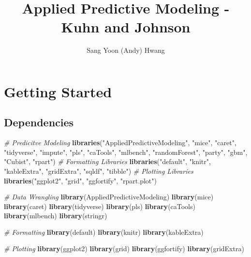 \documentclass[]{report}
\title{Applied Predictive Modeling - Kuhn and Johnson}
\author{Sang Yoon (Andy) Hwang}
\date{}
\newenvironment{Shaded}{\begin{snugshade}}{\end{snugshade}}
\newcommand{\KeywordTok}[1]{\textcolor[rgb]{0.13,0.29,0.53}{\textbf{#1}}}
\newcommand{\StringTok}[1]{\textcolor[rgb]{0.31,0.60,0.02}{#1}}
\newcommand{\CommentTok}[1]{\textcolor[rgb]{0.56,0.35,0.01}{\textit{#1}}}
\newcommand{\NormalTok}[1]{#1}
\begin{document}
\maketitle

{
\setcounter{tocdepth}{2}
\tableofcontents
}
\chapter*{Getting Started}\label{Overview}

\section{Dependencies}\label{dependencies}

\begin{Shaded}
\begin{Highlighting}[]
\CommentTok{# Predicitve Modeling}
\KeywordTok{libraries}\NormalTok{(}\StringTok{"AppliedPredictiveModeling"}\NormalTok{, }\StringTok{"mice"}\NormalTok{, }\StringTok{"caret"}\NormalTok{, }\StringTok{"tidyverse"}\NormalTok{, }\StringTok{"impute"}\NormalTok{, }\StringTok{"pls"}\NormalTok{, }
    \StringTok{"caTools"}\NormalTok{, }\StringTok{"mlbench"}\NormalTok{, }\StringTok{"randomForest"}\NormalTok{, }\StringTok{"party"}\NormalTok{, }\StringTok{"gbm"}\NormalTok{, }\StringTok{"Cubist"}\NormalTok{, }\StringTok{"rpart"}\NormalTok{)}
\CommentTok{# Formatting Libraries}
\KeywordTok{libraries}\NormalTok{(}\StringTok{"default"}\NormalTok{, }\StringTok{"knitr"}\NormalTok{, }\StringTok{"kableExtra"}\NormalTok{, }\StringTok{"gridExtra"}\NormalTok{, }\StringTok{"sqldf"}\NormalTok{, }\StringTok{"tibble"}\NormalTok{)}
\CommentTok{# Plotting Libraries}
\KeywordTok{libraries}\NormalTok{(}\StringTok{"ggplot2"}\NormalTok{, }\StringTok{"grid"}\NormalTok{, }\StringTok{"ggfortify"}\NormalTok{, }\StringTok{"rpart.plot"}\NormalTok{)}

\CommentTok{# Data Wrangling}
\KeywordTok{library}\NormalTok{(AppliedPredictiveModeling)}
\KeywordTok{library}\NormalTok{(mice)}
\KeywordTok{library}\NormalTok{(caret)}
\KeywordTok{library}\NormalTok{(tidyverse)}
\KeywordTok{library}\NormalTok{(pls)}
\KeywordTok{library}\NormalTok{(caTools)}
\KeywordTok{library}\NormalTok{(mlbench)}
\KeywordTok{library}\NormalTok{(stringr)}

\CommentTok{# Formatting}
\KeywordTok{library}\NormalTok{(default)}
\KeywordTok{library}\NormalTok{(knitr)}
\KeywordTok{library}\NormalTok{(kableExtra)}

\CommentTok{# Plotting}
\KeywordTok{library}\NormalTok{(ggplot2)}
\KeywordTok{library}\NormalTok{(grid)}
\KeywordTok{library}\NormalTok{(ggfortify)}
\KeywordTok{library}\NormalTok{(gridExtra)}
\end{Highlighting}
\end{Shaded}
\end{document}
